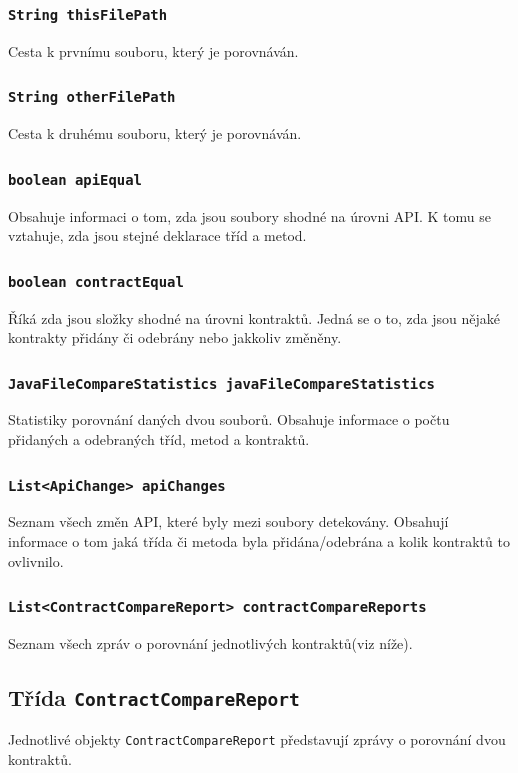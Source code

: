 			\subsubsection{\texttt{String thisFilePath}}
				Cesta k prvnímu souboru, který je porovnáván.
				
			\subsubsection{\texttt{String otherFilePath}}
				Cesta k druhému souboru, který je porovnáván.
				
			\subsubsection{\texttt{boolean apiEqual}}
				Obsahuje informaci o tom, zda jsou soubory shodné na úrovni API. K tomu se vztahuje, zda jsou stejné deklarace tříd a metod.
				
			\subsubsection{\texttt{boolean contractEqual}}
				Říká zda jsou složky shodné na úrovni kontraktů. Jedná se o to, zda jsou nějaké kontrakty přidány či odebrány nebo jakkoliv změněny.
				
			\subsubsection{\texttt{JavaFileCompareStatistics javaFileCompareStatistics}}
				Statistiky porovnání daných dvou souborů. Obsahuje informace o počtu přidaných a odebraných tříd, metod a kontraktů.
				
			\subsubsection{\texttt{List<ApiChange> apiChanges}}
				Seznam všech změn API, které byly mezi soubory detekovány. Obsahují informace o tom jaká třída či metoda byla přidána/odebrána a kolik kontraktů to ovlivnilo.
				
			\subsubsection{\texttt{List<ContractCompareReport> contractCompareReports}}
				Seznam všech zpráv o porovnání jednotlivých kontraktů(viz níže).
			
				
		\subsection{Třída \texttt{ContractCompareReport}}
			Jednotlivé objekty \texttt{ContractCompareReport} představují zprávy o porovnání dvou kontraktů.
			
